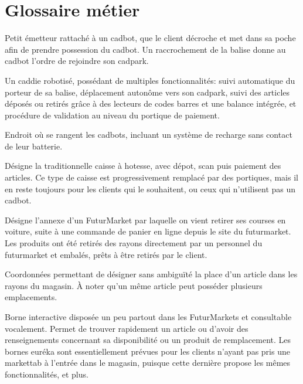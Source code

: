\chapter{Glossaire métier}

Petit émetteur rattaché à un cadbot, que le client décroche et met dans sa poche afin de prendre possession du cadbot.
Un raccrochement de la balise donne au cadbot l'ordre de rejoindre son cadpark.
\par

Un caddie robotisé, possédant de multiples fonctionnalités: suivi automatique du porteur de sa balise, déplacement autonôme vers son cadpark, suivi des articles déposés ou retirés grâce à des lecteurs de codes barres et une balance intégrée, et procédure de validation au niveau du portique de paiement.
\par

Endroit où se rangent les cadbots, incluant un système de recharge sans contact de leur batterie.
\par

Désigne la traditionnelle caisse à hotesse, avec dépot, scan puis paiement des articles.
Ce type de caisse est progressivement remplacé par des portiques, mais il en reste toujours pour les clients qui le souhaitent, ou ceux qui n'utilisent pas un cadbot.
\par

Désigne l'annexe d'un FuturMarket par laquelle on vient retirer ses courses en voiture, suite à une commande de panier en ligne depuis le site du futurmarket.
Les produits ont été retirés des rayons directement par un personnel du futurmarket et embalés, prêts à être retirés par le client.
\par

Coordonnées permettant de désigner sans ambiguïté la place d'un article dans les rayons du magasin.
À noter qu'un même article peut posséder plusieurs emplacements.
\par

Borne interactive disposée un peu partout dans les FuturMarkets et consultable vocalement.
Permet de trouver rapidement un article ou d'avoir des renseignements concernant sa disponibilité ou un produit de remplacement.
Les bornes euréka sont essentiellement prévues pour les clients n'ayant pas pris une markettab à l'entrée dans le magasin, puisque cette dernière propose les mêmes fonctionnalités, et plus.
\par

